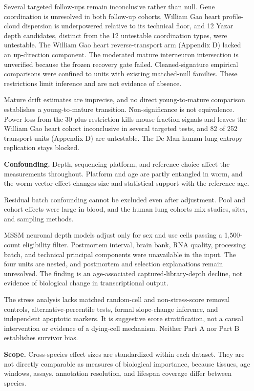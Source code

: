 \documentclass[11pt]{article}
\begin{document}
Several targeted follow-ups remain inconclusive rather than null. Gene coordination is unresolved in both follow-up cohorts, William Gao heart profile-cloud dispersion is underpowered relative to its technical floor, and 12 Yazar depth candidates, distinct from the 12 untestable coordination types, were untestable. The William Gao heart reverse-transport arm (Appendix D) lacked an up-direction component. The moderated mature interneuron intersection is unverified because the frozen recovery gate failed. Cleaned-signature empirical comparisons were confined to units with existing matched-null families. These restrictions limit inference and are not evidence of absence.

Mature drift estimates are imprecise, and no direct young-to-mature comparison establishes a young-to-mature transition. Non-significance is not equivalence. Power loss from the 30-plus restriction kills mouse fraction signals and leaves the William Gao heart cohort inconclusive in several targeted tests, and 82 of 252 transport units (Appendix D) are untestable. The De Man human lung entropy replication stays blocked.

\textbf{Confounding.} Depth, sequencing platform, and reference choice affect the measurements throughout. Platform and age are partly entangled in worm, and the worm vector effect changes size and statistical support with the reference age.

Residual batch confounding cannot be excluded even after adjustment. Pool and cohort effects were large in blood, and the human lung cohorts mix studies, sites, and sampling methods.

MSSM neuronal depth models adjust only for sex and use cells passing a 1,500-count eligibility filter. Postmortem interval, brain bank, RNA quality, processing batch, and technical principal components were unavailable in the input. The four units are nested, and postmortem and selection explanations remain unresolved. The finding is an age-associated captured-library-depth decline, not evidence of biological change in transcriptional output.

The stress analysis lacks matched random-cell and non-stress-score removal controls, alternative-percentile tests, formal slope-change inference, and independent apoptotic markers. It is suggestive score stratification, not a causal intervention or evidence of a dying-cell mechanism. Neither Part A nor Part B establishes survivor bias.

\textbf{Scope.} Cross-species effect sizes are standardized within each dataset. They are not directly comparable as measures of biological importance, because tissues, age windows, assays, annotation resolution, and lifespan coverage differ between species.
\end{document}
